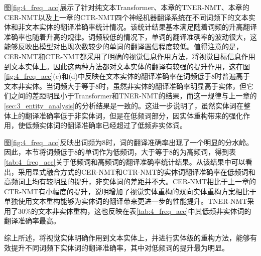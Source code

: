 图\ref{fig:4_freq_acc}展示了针对纯文本Transformer、本章的TNER-NMT、本章的CER-NMT以及上一章的CTR-NMT四个神经机器翻译系统在不同词频下的文本实体和非文本实体的翻译准确率统计情况。该统计结果基本满足随着词频的升高翻译准确率也随着升高的规律。词频较低的情况下，单词的翻译准确率的波动很大，这能够反映出模型对出现次数较少的单词的翻译置信程度较低。值得注意的是，CER-NMT和CTR-NMT都采用了明确的视觉信息作用方法，将视觉目标信息作用到文本实体上。因此这两种方法都对文本实体的翻译有较强的提升作用，这在图\ref{fig:4_freq_acc}(c)和(d)中反映在文本实体的翻译准确率在词频低于8时普遍高于文本非实体。当词频大于等于8时，虽然非实体的翻译准确率明显高于实体，但它们之间的差距明显小于Transformer和TNER-NMT的结果，而这一规律与上一章的\ref{sec:3_entity_analysis}的分析结果是一致的。这进一步说明了，虽然实体词在整体上的翻译准确率低于非实体词，但是在低频词部分，因实体重构带来的强化作用，使低频实体词的翻译准确率已经超过了低频非实体词。


图\ref{fig:4_freq_acc}反映出词频为8时，词的翻译准确率出现了一个明显的分水岭。因此，本节将词频低于8的单词作为低频词，大于等于8的为高频词，得到表\ref{tab:4_freq_acc}关于低频词和高频词的翻译准确率统计结果。从该结果中可以看出，采用显式融合方式的CER-NMT和CTR-NMT的实体词翻译准确率在低频词和高频词上均有较明显的提升，非实体词的差距并不大。CER-NMT相比于上一章的CTR-NMT有小幅度的提升，说明增加了视觉实体重构的双向实体重构方案相比于单独使用文本重构能够为实体词的翻译带来更进一步的性能提升。TNER-NMT采用了30\%的文本非实体重构，这也反映在表\ref{tab:4_freq_acc}中其低频非实体词的翻译准确率最高。

综上所述，将视觉实体明确作用到文本实体上，并进行实体级的重构方法，能够有效提升不同词频下实体词的翻译准确率，其中对低频词的提升最为明显。